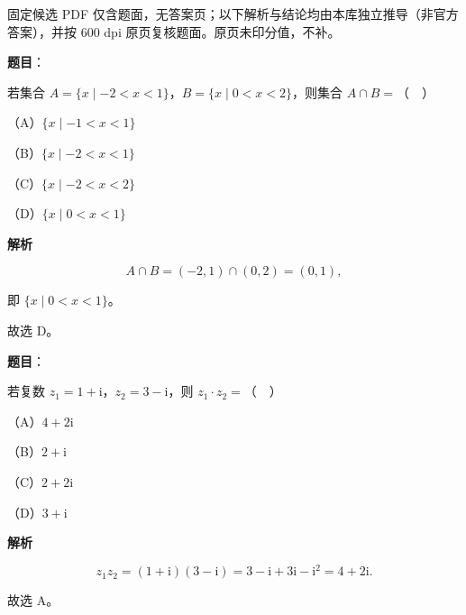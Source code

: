 
\begin{gktip}
固定候选 PDF 仅含题面，无答案页；以下解析与结论均由本库独立推导（非官方答案），并按 600 dpi 原页复核题面。原页未印分值，不补。
\end{gktip}

\begin{answer}

\textbf{题目}：

若集合 $A=\{x\mid -2<x<1\}$，$B=\{x\mid 0<x<2\}$，则集合 $A\cap B=$（　）

（A）$\{x\mid -1<x<1\}$

（B）$\{x\mid -2<x<1\}$

（C）$\{x\mid -2<x<2\}$

（D）$\{x\mid 0<x<1\}$

\textbf{解析}

\nopagebreak[4]
\[A\cap B=(-2,1)\cap(0,2)=(0,1),\]

即 $\{x\mid 0<x<1\}$。

故选 D。


\end{answer}
\begin{answer}

\textbf{题目}：

若复数 $z_1=1+\mathrm i$，$z_2=3-\mathrm i$，则 $z_1\cdot z_2=$（　）

（A）$4+2\mathrm i$

（B）$2+\mathrm i$

（C）$2+2\mathrm i$

（D）$3+\mathrm i$

\textbf{解析}

\nopagebreak[4]
\[z_1z_2=(1+\mathrm i)(3-\mathrm i)
=3-\mathrm i+3\mathrm i-\mathrm i^2
=4+2\mathrm i.\]

故选 A。


\end{answer}
